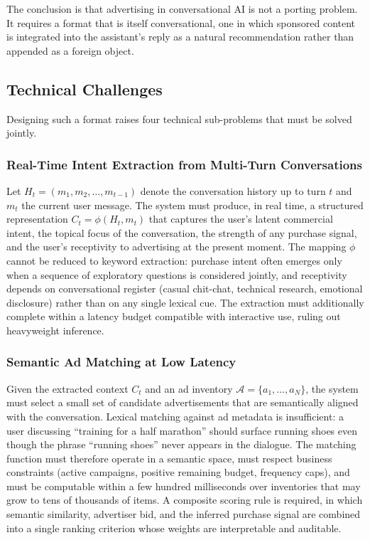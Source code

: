 The conclusion is that advertising in conversational AI is not a porting
problem. It requires a format that is itself conversational, one in which
sponsored content is integrated into the assistant's reply as a natural
recommendation rather than appended as a foreign object.

\subsection{Technical Challenges}
\label{subsec:technical-challenges}

Designing such a format raises four technical sub-problems that must be solved
jointly.

\subsubsection{Real-Time Intent Extraction from Multi-Turn Conversations}
\label{subsubsec:intent-extraction}

Let $H_t = (m_1, m_2, \ldots, m_{t-1})$ denote the conversation history up to
turn $t$ and $m_t$ the current user message. The system must produce, in real
time, a structured representation $C_t = \phi(H_t, m_t)$ that captures the
user's latent commercial intent, the topical focus of the conversation, the
strength of any purchase signal, and the user's receptivity to advertising at
the present moment. The mapping $\phi$ cannot be reduced to keyword extraction:
purchase intent often emerges only when a sequence of exploratory questions is
considered jointly, and receptivity depends on conversational register
(casual chit-chat, technical research, emotional disclosure) rather than on any
single lexical cue. The extraction must additionally complete within a latency
budget compatible with interactive use, ruling out heavyweight inference.

\subsubsection{Semantic Ad Matching at Low Latency}
\label{subsubsec:semantic-matching}

Given the extracted context $C_t$ and an ad inventory
$\mathcal{A} = \{a_1, \ldots, a_N\}$, the system must select a small set of
candidate advertisements that are semantically aligned with the conversation.
Lexical matching against ad metadata is insufficient: a user discussing
``training for a half marathon'' should surface running shoes even though the
phrase ``running shoes'' never appears in the dialogue. The matching function
must therefore operate in a semantic space, must respect business constraints
(active campaigns, positive remaining budget, frequency caps), and must be
computable within a few hundred milliseconds over inventories that may grow to
tens of thousands of items. A composite scoring rule is required, in which
semantic similarity, advertiser bid, and the inferred purchase signal are
combined into a single ranking criterion whose weights are interpretable and
auditable.

